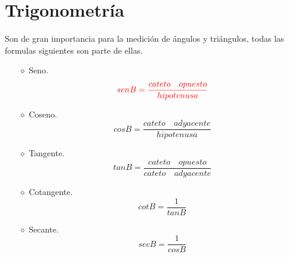 \documentclass[letterpaper,pt12]{article}
\begin{document}
\section*{Trigonometría}
Son de gran importancia para la medición de ángulos y triángulos, todas las formulas siguientes son parte de ellas.
\begin{itemize}
\item [$\diamond$]{Seno.}
\begin{equation*}
    \textcolor{red}{sen B=\frac{cateto\quad opuesto}{hipotenusa}}
\end{equation*}  

\item [$\diamond$]{Coseno.}
\begin{equation*}
  cosB=\frac{cateto\quad adyacente}{hipotenusa}  
\end{equation*} 

\item [$\diamond$]{Tangente.}
\begin{equation*}
    tanB=\frac{cateto\quad opuesto}{cateto\quad adyacente}
\end{equation*} 

\item [$\diamond$]{Cotangente.}
\begin{equation*}
    cotB=\frac{1}{tanB}
\end{equation*} 

\item [$\diamond$]{Secante.}
\begin{equation*}
    secB=\frac{1}{cosB}
\end{equation*} 
    
    
    
    
\end{itemize}
\end{document}
